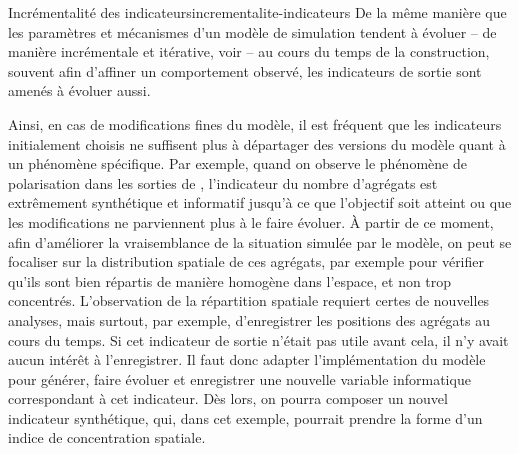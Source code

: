 \clearpage
\begin{encadre}{Incrémentalité des indicateurs}{incrementalite-indicateurs}
\renewcommand{\thempfootnote}{\alph{mpfootnote}}
\noindent De la même manière que les paramètres et mécanismes d'un modèle de simulation tendent à évoluer -- de manière incrémentale et itérative, voir \textcite{thomas_revisiting_2012} -- au cours du temps de la construction, souvent afin d'affiner un comportement observé, les indicateurs de sortie sont amenés à évoluer aussi.

Ainsi, en cas de modifications fines du modèle, il est fréquent que les indicateurs initialement choisis ne suffisent plus à départager des versions du modèle quant à un phénomène spécifique.
Par exemple, quand on observe le phénomène de polarisation dans les sorties de \simfeodal{}, l'indicateur du nombre d'agrégats est extrêmement synthétique et informatif jusqu'à ce que l'objectif soit atteint ou que les modifications ne parviennent plus à le faire évoluer.
À partir de ce moment, afin d'améliorer la vraisemblance de la situation simulée par le modèle, on peut se focaliser sur la distribution spatiale de ces agrégats, par exemple pour vérifier qu'ils sont bien répartis de manière homogène dans l'espace, et non trop concentrés.
L'observation de la répartition spatiale requiert certes de nouvelles analyses, mais surtout, par exemple, d'enregistrer les positions des agrégats au cours du temps.
Si cet indicateur de sortie n'était pas utile avant cela, il n'y avait aucun intérêt à l'enregistrer.
Il faut donc adapter l'implémentation du modèle pour générer, faire évoluer et enregistrer une nouvelle variable informatique correspondant à cet indicateur.
Dès lors, on pourra composer un nouvel indicateur synthétique, qui, dans cet exemple, pourrait prendre la forme d'un indice de concentration spatiale.


\end{encadre}
